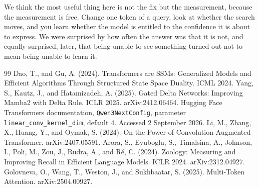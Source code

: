 \documentclass[11pt,a4paper]{article}
\begin{document}
We think the most useful thing here is not the fix but the measurement, because the measurement is
free. Change one token of a query, look at whether the search moves, and you learn whether the model
is entitled to the confidence it is about to express. We were surprised by how often the answer was
that it is not, and equally surprised, later, that being unable to see something turned out not to
mean being unable to learn it.


\begin{thebibliography}{99}
 Dao, T., and Gu, A. (2024). Transformers are SSMs: Generalized Models and Efficient Algorithms Through Structured State Space Duality. ICML 2024.
 Yang, S., Kautz, J., and Hatamizadeh, A. (2025). Gated Delta Networks: Improving Mamba2 with Delta Rule. ICLR 2025. arXiv:2412.06464.
 Hugging Face Transformers documentation, \texttt{Qwen3NextConfig}, parameter \texttt{linear\_conv\_kernel\_dim}, default $4$. Accessed 2 September 2026.
 Li, M., Zhang, X., Huang, Y., and Oymak, S. (2024). On the Power of Convolution Augmented Transformer. arXiv:2407.05591.
 Arora, S., Eyuboglu, S., Timalsina, A., Johnson, I., Poli, M., Zou, J., Rudra, A., and R\'e, C. (2024). Zoology: Measuring and Improving Recall in Efficient Language Models. ICLR 2024. arXiv:2312.04927.
 Golovneva, O., Wang, T., Weston, J., and Sukhbaatar, S. (2025). Multi-Token Attention. arXiv:2504.00927.
\end{thebibliography}
\end{document}

